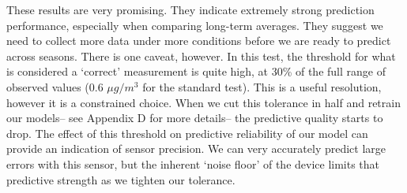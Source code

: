 These results are very promising.  They indicate extremely strong prediction performance, especially when comparing long-term averages.  They suggest we need to collect more data under more conditions before we are ready to predict across seasons.  There is one caveat, however.  In this test, the threshold for what is considered a `correct' measurement is quite high, at 30\% of the full range of observed values (0.6 $\mu g/m^3$ for the standard test).  This is a useful resolution, however it is a constrained choice.  When we cut this tolerance in half and retrain our models-- see Appendix D for more details-- the predictive quality starts to drop.  The effect of this threshold on predictive reliability of our model can provide an indication of sensor precision.  We can very accurately predict large errors with this sensor, but the inherent `noise floor' of the device limits that predictive strength as we tighten our tolerance.  
  

